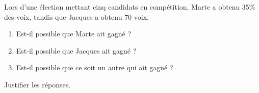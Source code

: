 
\begin{exercice}\label{exosmath-0887}

Lors d'une élection mettant cinq candidats en compétition, Marte a obtenu $35 \%$ des voix, tandis que Jacques a obtenu $70$ voix.
\begin{enumerate}
    \item
        Est-il possible que Marte ait gagné ?       
    \item
        Est-il possible que Jacques ait gagné ?
    \item
        Est-il possible que ce soit un autre qui ait gagné ?
\end{enumerate}
Justifier les réponses.

\end{exercice}
